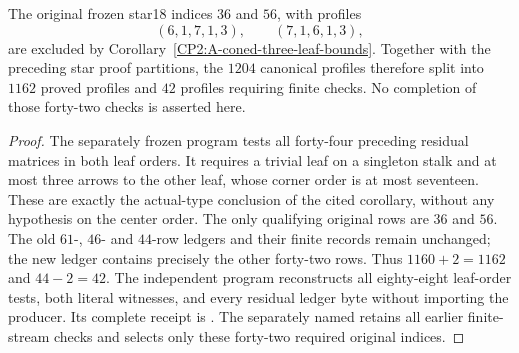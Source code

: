 \begin{proposition}
\label{CP2:A-star-eighteen-universal-three-scope}
The original frozen star18 indices $36$ and $56$, with profiles
\[
 (6,1,7,1,3),\qquad (7,1,6,1,3),
\]
are excluded by Corollary~\ref{CP2:A-coned-three-leaf-bounds}.
Together with the preceding star proof partitions, the
$1204$ canonical profiles therefore split into $1162$
proved profiles and $42$ profiles requiring finite checks.
No completion of those forty-two checks is asserted here.
\end{proposition}
\begin{proof}
The separately frozen program
tests all forty-four preceding residual matrices in both
leaf orders. It requires a trivial leaf on a singleton
stalk and at most three arrows to the other leaf, whose
corner order is at most seventeen. These are exactly the
actual-type conclusion of the cited corollary, without
any hypothesis on the center order. The only qualifying
original rows are $36$ and $56$. The old $61$-, $46$- and
$44$-row ledgers and their finite records remain unchanged;
the new ledger contains precisely the other forty-two rows.
Thus $1160+2=1162$ and $44-2=42$.
The independent program
reconstructs all eighty-eight leaf-order tests, both
literal witnesses, and every residual ledger byte without
importing the producer. Its complete receipt is
.
The separately named
retains all earlier finite-stream checks and selects only
these forty-two required original indices.
\end{proof}

